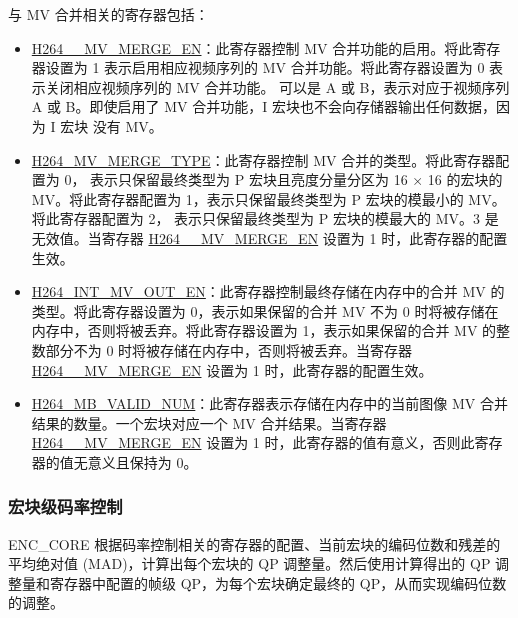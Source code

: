 \documentclass[main\_\_CN.tex]{subfiles}
\begin{document}
与 MV 合并相关的寄存器包括：
\begin{itemize}
    \item \hyperref[fielddesc:H264AMVMERGEEN]{H264\_\_MV\_MERGE\_EN}：此寄存器控制 MV 合并功能的启用。将此寄存器设置为 1 表示启用相应视频序列的 MV 合并功能。将此寄存器设置为 0 表示关闭相应视频序列的 MV 合并功能。 可以是 A 或 B，表示对应于视频序列 A 或 B。即使启用了 MV 合并功能，I 宏块也不会向存储器输出任何数据，因为 I 宏块 没有 MV。
    \item \hyperref[fielddesc:H264MVMERGETYPE]{H264\_MV\_MERGE\_TYPE}：此寄存器控制 MV 合并的类型。将此寄存器配置为 0， 表示只保留最终类型为 P 宏块且亮度分量分区为 16 × 16 的宏块的 MV。将此寄存器配置为 1，表示只保留最终类型为 P 宏块的模最小的 MV。将此寄存器配置为 2， 表示只保留最终类型为 P 宏块的模最大的 MV。3 是无效值。当寄存器 \hyperref[fielddesc:H264AMVMERGEEN]{H264\_\_MV\_MERGE\_EN} 设置为 1 时，此寄存器的配置生效。
    \item \hyperref[fielddesc:H264INTMVOUTEN]{H264\_INT\_MV\_OUT\_EN}：此寄存器控制最终存储在内存中的合并 MV 的类型。将此寄存器设置为 0，表示如果保留的合并 MV 不为 0 时将被存储在内存中，否则将被丢弃。将此寄存器设置为 1，表示如果保留的合并 MV 的整数部分不为 0 时将被存储在内存中，否则将被丢弃。当寄存器 \hyperref[fielddesc:H264AMVMERGEEN]{H264\_\_MV\_MERGE\_EN} 设置为 1 时，此寄存器的配置生效。
    \item \hyperref[fielddesc:H264MBVALIDNUM]{H264\_MB\_VALID\_NUM}：此寄存器表示存储在内存中的当前图像 MV 合并结果的数量。一个宏块对应一个 MV 合并结果。当寄存器 \hyperref[fielddesc:H264AMVMERGEEN]{H264\_\_MV\_MERGE\_EN} 设置为 1 时，此寄存器的值有意义，否则此寄存器的值无意义且保持为 0。
\end{itemize}


\subsubsection{宏块级码率控制}\label{sec:h264-rate-ctrl}
ENC\_CORE 根据码率控制相关的寄存器的配置、当前宏块的编码位数和残差的平均绝对值 (MAD)，计算出每个宏块的 QP 调整量。然后使用计算得出的 QP 调整量和寄存器中配置的帧级 QP，为每个宏块确定最终的 QP，从而实现编码位数的调整。
\end{document}
